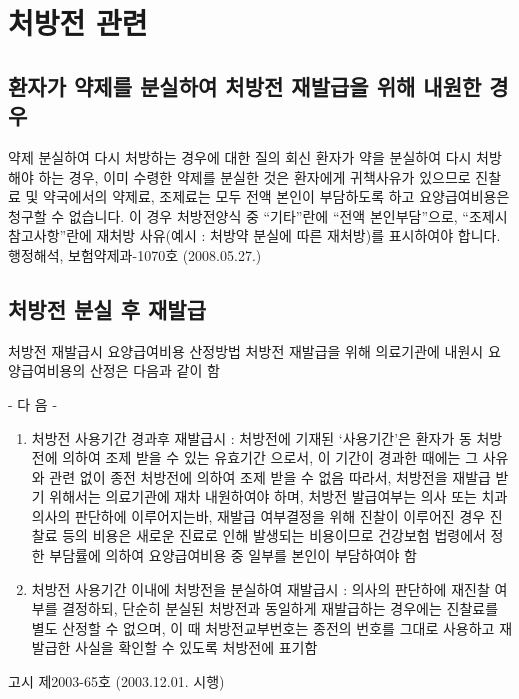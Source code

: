 ﻿\section{처방전 관련}
\subsection{환자가 약제를 분실하여 처방전 재발급을 위해 내원한 경우}

\begin{commentbox}{약제 분실하여 다시 처방하는 경우에 대한 질의 회신}
환자가 약을 분실하여 다시 처방해야 하는 경우, 이미 수령한 약제를 분실한 것은 환자에게 귀책사유가 있으므로 진찰료 및 약국에서의 약제료, 조제료는 모두 전액 본인이 부담하도록 하고 요양급여비용은 청구할 수 없습니다. 이 경우 처방전양식 중 “기타”란에 “전액 본인부담”으로, “조제시 참고사항”란에 재처방 사유(예시 : 처방약 분실에 따른 재처방)를 표시하여야 합니다. 행정해석, 보험약제과-1070호 (2008.05.27.)
\end{commentbox}

\subsection{처방전 분실 후 재발급}

\begin{commentbox}{처방전 재발급시 요양급여비용 산정방법}
처방전 재발급을 위해 의료기관에 내원시 요양급여비용의 산정은 다음과 같이 함\par
- 다 음 -
\begin{enumerate}[가.]\tightlist
\item 처방전 사용기간 경과후 재발급시
: 처방전에 기재된 ‘사용기간’은 환자가 동 처방전에 의하여 조제 받을 수 있는 유효기간 으로서, 이 기간이 경과한 때에는 그 사유와 관련 없이 종전 처방전에 의하여 조제 받을 수 없음 따라서, 처방전을 재발급 받기 위해서는 의료기관에 재차 내원하여야 하며, 처방전 발급여부는 의사 또는 치과의사의 판단하에 이루어지는바, 재발급 여부결정을 위해 진찰이 이루어진 경우 진찰료 등의 비용은 새로운 진료로 인해 발생되는 비용이므로 건강보험 법령에서 정한 부담률에 의하여 요양급여비용 중 일부를 본인이 부담하여야 함
\item 처방전 사용기간 이내에 처방전을 분실하여 재발급시
: 의사의 판단하에 재진찰 여부를 결정하되, 단순히 분실된 처방전과 동일하게 재발급하는 경우에는 진찰료를 별도 산정할 수 없으며, 이 때 처방전교부번호는 종전의 번호를 그대로 사용하고 재발급한 사실을 확인할 수 있도록 처방전에 표기함
\end{enumerate}
고시 제2003-65호 (2003.12.01. 시행)
\end{commentbox}